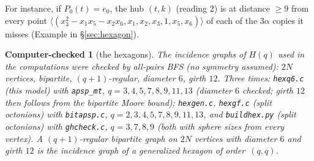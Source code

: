 \documentclass[11pt]{amsart}
\newcommand{\file}[1]{\nolinkurl{#1}}
\theoremstyle{plain}
\newtheorem{computer}{Computer-checked}
\theoremstyle{definition}
\theoremstyle{remark}
\begin{document}
For instance, if $P_0(t) = e_0$, the hub $(t,k)$ (reading 2) is at distance $\ge 9$ from every point
$\langle(x_3^2 - x_1x_5 - x_2x_6, x_1, x_2, x_3, 1, x_5, x_6)\rangle$ of each of the $3\alpha$ copies it misses
(Example in \S\ref{sec:hexagon}).

\begin{computer}[the hexagons]\label{cc:hex}
The incidence graphs of $H(q)$ used in the computations were checked by all-pairs BFS (no symmetry assumed): $2N$
vertices, bipartite, $(q+1)$-regular, diameter $6$, girth $12$. Three times: \file{hexq6.c} (this model) with
\file{apsp_mt}, $q = 3,4,5,7,8,9,11,13$ (diameter $6$ checked; girth $12$ then follows from the bipartite Moore bound);
\file{hexgen.c}, \file{hexgf.c} (split octonions) with \file{bitapsp.c}, $q = 2,3,4,5,7,8,9,11,13$, and
\file{buildhex.py} (split octonions) with \file{ghcheck.c}, $q = 3,7,8,9$ (both with sphere sizes from every vertex). A $(q+1)$-regular bipartite graph on $2N$ vertices with diameter $6$ and girth $12$ is the incidence graph
of a generalized hexagon of order~$(q,q)$.
\end{computer}
\end{document}
